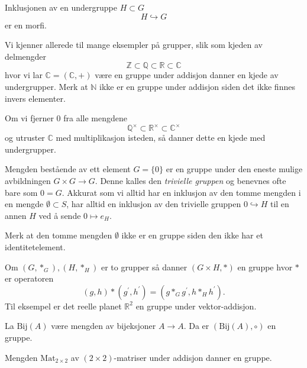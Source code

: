 \begin{remark}
    Inklusjonen av en undergruppe $H\subset G$
    \[
        H\hookrightarrow G
    \]
    er en morfi.
\end{remark}

\begin{example}
    Vi kjenner allerede til mange eksempler på grupper,
    slik som kjeden av delmengder
    \[
        \mathbb Z
        \subset \mathbb Q
        \subset \mathbb R
        \subset \mathbb C
    \]
    hvor vi lar $\mathbb C = (\mathbb C, +)$ være en gruppe under addisjon
    danner en kjede av undergrupper.
    Merk at $\mathbb N$ ikke er en gruppe under addisjon siden det ikke finnes
    invers elementer.

    Om vi fjerner $0$ fra alle mengdene
    \[
        \mathbb Q^\times
        \subset \mathbb R^\times
        \subset \mathbb C^\times
    \]
    og utruster $\mathbb C$ med multiplikasjon isteden,
    så danner dette en kjede med undergrupper.
\end{example}

\begin{example}
    Mengden bestående av ett element $G = \{0\}$ er en gruppe under
    den eneste mulige avbildningen $G\times G\to G$.
    Denne kalles den \textit{trivielle gruppen} og benevnes ofte bare som $0 = G$.
    Akkurat som vi alltid har en inklusjon av den tomme mengden i en mengde
    $\emptyset \subset S$,
    har alltid en inklusjon av den trivielle gruppen $0\hookrightarrow H$
    til en annen $H$ ved å sende $0\mapsto e_H$.

    Merk at den tomme mengden $\emptyset$ ikke er en gruppe
    siden den ikke har et identitetelement.
\end{example}

\begin{example}
    Om $(G, \ast_G), (H, \ast_H)$ er to grupper så danner $(G\times H, \ast)$
    en gruppe hvor $\ast$ er operatoren
    \[
        (g, h)\ast (g^\prime, h^\prime)
        = (g \ast_G g^\prime, h\ast_H h^\prime).
    \]
    Til eksempel er det reelle planet $\mathbb R^2$ en gruppe under vektor-addisjon.
\end{example}

\begin{example}
    La $\mathrm{Bij}(A)$ være mengden av bijeksjoner $A\to A$.
    Da er $(\mathrm{Bij}(A), \circ)$ en gruppe.
\end{example}

\begin{example}
    Mengden $\mathrm{Mat}_{2\times 2}$ av $(2\times 2)$-matriser under addisjon
    danner en gruppe.
\end{example}

